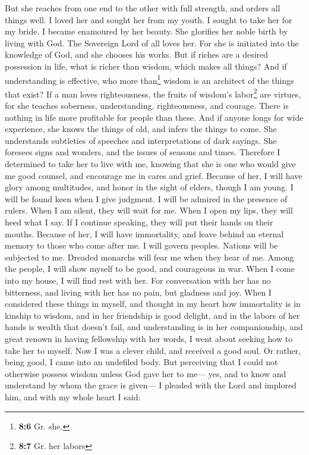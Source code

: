  But she reaches from one end to the other with full
strength, and orders all things well.  I loved her and
sought her from my youth. I sought to take her for my bride. I became
enamoured by her beauty.  She glorifies her noble birth by
living with God. The Sovereign Lord of all loves her.  For
she is initiated into the knowledge of God, and she chooses his works.
 But if riches are a desired possession in life, what is
richer than wisdom, which makes all things?  And if
understanding is effective, who more than\footnote{\textbf{8:6} Gr. she.}
wisdom is an architect of the things that exist?  If a man
loves righteousness, the fruits of wisdom's labor\footnote{\textbf{8:7}
  Gr. her labors} are virtues, for she teaches soberness, understanding,
righteousness, and courage. There is nothing in life more profitable for
people than these.  And if anyone longs for wide
experience, she knows the things of old, and infers the things to come.
She understands subtleties of speeches and interpretations of dark
sayings. She foresees signs and wonders, and the issues of seasons and
times.  Therefore I determined to take her to live with
me, knowing that she is one who would give me good counsel, and
encourage me in cares and grief.  Because of her, I will
have glory among multitudes, and honor in the sight of elders, though I
am young.  I will be found keen when I give judgment. I
will be admired in the presence of rulers.  When I am
silent, they will wait for me. When I open my lips, they will heed what
I say. If I continue speaking, they will put their hands on their
mouths.  Because of her, I will have immortality, and
leave behind an eternal memory to those who come after me.
 I will govern peoples. Nations will be subjected to me.
 Dreaded monarchs will fear me when they hear of me.
Among the people, I will show myself to be good, and courageous in war.
 When I come into my house, I will find rest with her.
For conversation with her has no bitterness, and living with her has no
pain, but gladness and joy.  When I considered these
things in myself, and thought in my heart how immortality is in kinship
to wisdom,  and in her friendship is good delight, and in
the labors of her hands is wealth that doesn't fail, and understanding
is in her companionship, and great renown in having fellowship with her
words, I went about seeking how to take her to myself. 
Now I was a clever child, and received a good soul.  Or
rather, being good, I came into an undefiled body.  But
perceiving that I could not otherwise possess wisdom unless God gave her
to me--- yes, and to know and understand by whom the grace is given--- I
pleaded with the Lord and implored him, and with my whole heart I said:

